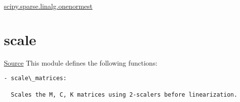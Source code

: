 \documentclass[letterpaper,10pt,english]{sphinxmanual}
\begin{document}


\href{http://docs.scipy.org/doc/scipy-dev/reference/generated/scipy.sparse.linalg.onenormest.html}{scipy.sparse.linalg.onenormest}




\section{scale}
\label{index:scale}
\href{https://bitbucket.org/akadar/brakesqueal0.1/src/10fdbd0824e88ebbee4f44cefa781c01e586db41/brake/initialize/scale.py?at=master}{Source}
\label{index:module-brake.initialize.scale}
This module defines the following functions:

\begin{Verbatim}[commandchars=\\\{\}]
- scale\_matrices:

  Scales the M, C, K matrices using 2-scalers before linearization.
\end{Verbatim}
\end{document}
